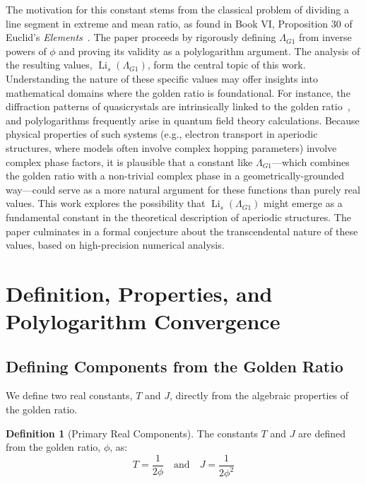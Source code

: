 \documentclass{amsart}
\theoremstyle{plain}
\theoremstyle{definition}
\newtheorem{definition}[theorem]{Definition}
\theoremstyle{remark}
\DeclareMathOperator{\Li}{Li}
\newcommand{\LambdaG}{\Lambda_{G1}}
\newcommand{\phiG}{\phi}
\begin{document}
The motivation for this constant stems from the classical problem of dividing a line segment in extreme and mean ratio, as found in Book VI, Proposition 30 of Euclid's \textit{Elements}~\cite{Euclid}. The paper proceeds by rigorously defining $\LambdaG$ from inverse powers of $\phiG$ and proving its validity as a polylogarithm argument. The analysis of the resulting values, $\Li_s(\LambdaG)$, form the central topic of this work. Understanding the nature of these specific values may offer insights into mathematical domains where the golden ratio is foundational. For instance, the diffraction patterns of quasicrystals are intrinsically linked to the golden ratio~\cite{Levine1984}, and polylogarithms frequently arise in quantum field theory calculations. Because physical properties of such systems (e.g., electron transport in aperiodic structures, where models often involve complex hopping parameters) involve complex phase factors, it is plausible that a constant like $\LambdaG$—which combines the golden ratio with a non-trivial complex phase in a geometrically-grounded way—could serve as a more natural argument for these functions than purely real values. This work explores the possibility that $\Li_s(\LambdaG)$ might emerge as a fundamental constant in the theoretical description of aperiodic structures. The paper culminates in a formal conjecture about the transcendental nature of these values, based on high-precision numerical analysis.

\section{Definition, Properties, and Polylogarithm Convergence}

\subsection{Defining Components from the Golden Ratio}
We define two real constants, $T$ and $J$, directly from the algebraic properties of the golden ratio.
\begin{definition}[Primary Real Components]
The constants $T$ and $J$ are defined from the golden ratio, $\phiG$, as:
\[ T = \frac{1}{2\phiG} \quad \text{and} \quad J = \frac{1}{2\phiG^2} \]
\end{definition}
\end{document}
